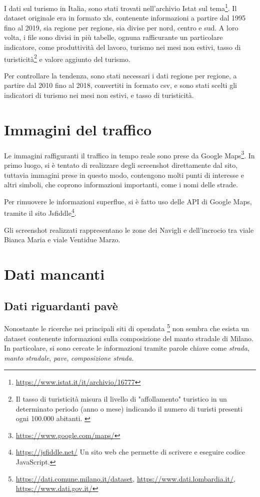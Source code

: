 \documentclass[a4paper,12pt]{report}
\newcommand{\quotestyle}[1]{\textit{#1}}
\begin{document}
I dati sul turismo in Italia, sono stati trovati nell'archivio Istat sul 
tema\footnote{\url{https://www.istat.it/it/archivio/16777}}.
Il dataset originale era in formato xls, contenente informazioni a partire dal 1995 
fino al 2019, sia regione per regione, sia divise per nord, centro e sud.
A loro volta, i file sono divisi in più tabelle, ognuna rafficurante un particolare 
indicatore, come produttività del lavoro, turismo nei mesi non estivi, 
tasso di turisticità\footnote{Il tasso di turisticità misura il livello di "affollamento" 
turistico in un determinato periodo (anno o mese) indicando il numero di turisti presenti 
ogni 100.000 abitanti. \cite{ONTIT:1}} 
e valore aggiunto del turismo.

Per controllare la tendenza, sono stati necessari i dati regione per regione, 
a partire dal 2010 fino al 2018, convertiti in formato csv, e sono stati scelti gli 
indicatori di turismo nei mesi non estivi, e tasso di turisticità. 

\section{Immagini del traffico}

Le immagini raffiguranti il traffico in tempo reale sono prese da Google 
Maps\footnote{\url{https://www.google.com/maps/}}. 
In primo luogo, si è tentato di realizzare degli screenshot direttamente dal sito, 
tuttavia immagini prese in questo modo, contengono molti punti di interesse e altri simboli, 
che coprono informazioni importanti, come i nomi delle strade.

Per rimuovere le informazioni superflue, si è fatto uso delle API di Google Maps, 
tramite il sito Jsfiddle\footnote{\url{https://jsfiddle.net/} Un sito web che permette di 
scrivere e eseguire codice JavaScript.}.

Gli screenshot realizzati rappresentano le zone dei Navigli e dell'incrocio tra viale 
Bianca Maria e viale Ventidue Marzo.

\section{Dati mancanti}

\subsection{Dati riguardanti pavè}

Nonostante le ricerche nei principali siti di opendata
\footnote{
    \url{https://dati.comune.milano.it/dataset}, 
    \url{https://www.dati.lombardia.it/},
    \url{https://www.dati.gov.it/}
    }
non sembra che esista un dataset contenente informazioni sulla composizione del 
manto stradale di Milano. 
In particolare, si sono cercate le informazioni tramite parole chiave come 
\quotestyle{strada}, \quotestyle{manto stradale}, \quotestyle{pave}, 
\quotestyle{composizione strada}.
\end{document}
